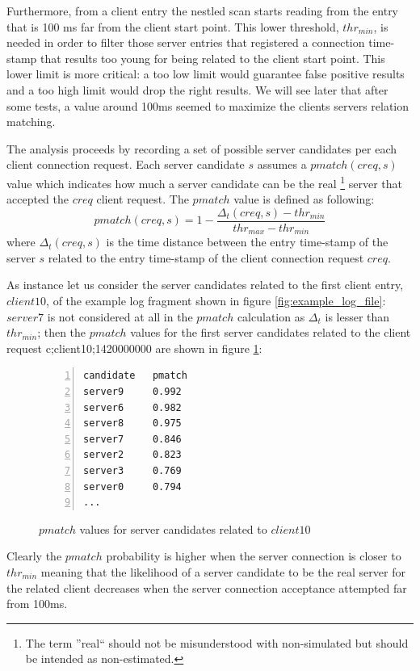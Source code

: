 Furthermore, from a client
entry the nestled scan starts reading from the entry that is 100 ms far
from the client start point. This lower threshold, $thr_{min}$, is needed in order to
 filter those server entries that registered a connection time-stamp
that results too young for being related to the client start point. This
lower limit is more critical: a too low limit would guarantee false
positive results and a too high limit would drop the right results.
We will see later that after some tests, a value around 100ms seemed to maximize 
the clients servers relation matching. %

The analysis proceeds by recording a set of possible server candidates 
 per each client connection request. Each server candidate $s$ assumes a
$pmatch(creq,s)$ value which
indicates how much a server candidate can be the real
\footnote{The term ''real`` should not be misunderstood with
non-simulated but should be intended as non-estimated.}
 server that
accepted the $creq$
client request. The $pmatch$ value is defined
as following:
\begin{equation}
pmatch(creq, s) = 1 - \frac{\Delta_t(creq, s) - thr_{min}}{thr_{max} - thr_{min}}
\end{equation}
where $\Delta_t(creq, s)$ is the time distance between the entry
time-stamp of the server $s$ related to the entry time-stamp of the client connection request
$creq$.

As instance let us consider the server candidates related to the first
client entry, $client10$, of the example log
fragment shown in figure \ref{fig:example_log_file}: 
$server7$ is not considered at all in the $pmatch$ calculation  as
$\Delta_t$ 
is lesser than $thr_{min}$; then the $pmatch$ values for the first server
candidates related to the client request c;client10;1420000000 are shown in figure \ref{fig:pmatch}:
\begin{figure}[h]
\begin{lstlisting}[language=bash,frame=single, numbers=left]
candidate 	pmatch
server9 	0.992
server6 	0.982
server8 	0.975
server7  	0.846
server2  	0.823 
server3  	0.769
server0  	0.794
...
\end{lstlisting}
\caption{$pmatch$ values for server candidates related to $client10$}
\label{fig:pmatch}
\end{figure}

Clearly the $pmatch$ probability is higher when the server connection is
closer to $thr_{min}$ meaning that the likelihood of a server
candidate to be the real server for the related client decreases when
the server connection acceptance attempted far from 100ms. 


